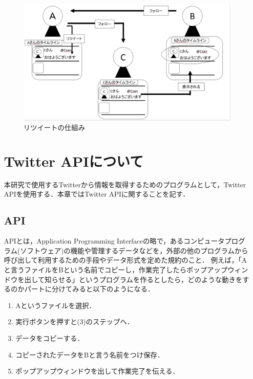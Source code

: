 \begin{figure}[H]
\centering
\includegraphics[width=15cm]{rtrogic.png}
\caption{リツイートの仕組み}\label{リツイートの仕組み}
\end{figure}

\section{Twitter APIについて}

本研究で使用するTwitterから情報を取得するためのプログラムとして，Twitter APIを使用する．本章ではTwitter APIに関することを記す．

\subsection{API}

APIとは，Application Programming Interfaceの略で，あるコンピュータプログラム(ソフトウェア)の機能や管理するデータなどを，外部の他のプログラムから呼び出して利用するための手段やデータ形式を定めた規約のこと\cite{api}．
例えば，「Aと言うファイルをBという名前でコピーし，作業完了したらポップアップウィンドウを出して知らせる」というプログラムを作るとしたら，どのような動きをするのかパートに分けてみると以下のようになる．

\begin{enumerate}
 \item Aというファイルを選択．
 \item 実行ボタンを押すと(3)のステップへ．
 \item データをコピーする．
 \item コピーされたデータをBと言う名前をつけ保存．
 \item ポップアップウィンドウを出して作業完了を伝える．
\end{enumerate}

